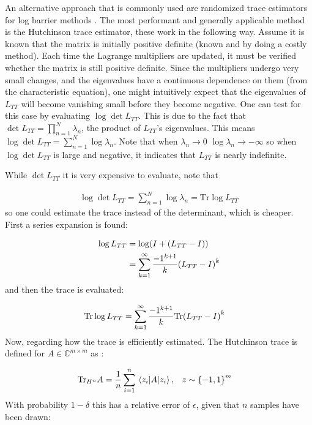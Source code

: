 \documentclass[twocolumn]{revtex4-2}
\begin{document}
An alternative approach that is commonly used are randomized trace estimators for log barrier methods \cite{boyd2004convex}. The most performant and generally applicable method is the Hutchinson trace estimator, these work in the following way. Assume it is known that the matrix is initially positive definite (known and by doing a costly method). Each time the Lagrange multipliers are updated, it must be verified whether the matrix is still positive definite. Since the multipliers undergo very small changes, and the eigenvalues have a continuous dependence on them (from the characteristic equation), one might intuitively expect that the eigenvalues of $L_{TT}$ will become vanishing small before they become negative. One can test for this case by evaluating $\log\det L_{TT}$. This is due to the fact that $\det L_{TT}=\prod_{n=1}^N\lambda_n$, the product of $L_{TT}$’s eigenvalues. This means $\log\det L_{TT}=\sum_{n=1}^N\log\lambda_n$. Note that when $\lambda_n\rightarrow 0$ $\log\lambda_n\rightarrow-\infty$ so when $\log\det L_{TT}$ is large and negative, it indicates that $L_{TT}$ is nearly indefinite.

While $\det L_{TT}$ it is very expensive to evaluate, note that

\begin{align}
\log\det L_{TT}=\sum_{n=1}^N\log\lambda_n = \text{Tr}\log L_{TT}
\end{align}
so one could estimate the trace instead of the determinant, which is cheaper. First a series expansion is found:

\begin{align}
\log L_{TT} &= \log(I + \qty(L_{TT} - I))\\
&=\sum_{k=1}^\infty\frac{-1^{k+1}}{k}\qty(L_{TT} - I)^k
\end{align}
and then the trace is evaluated:


\begin{align}
\text{Tr}\log L_{TT} &= \sum_{k=1}^\infty\frac{-1^{k+1}}{k}\text{Tr}\qty(L_{TT} - I)^k
\end{align}
Now, regarding how the trace is efficiently estimated. The Hutchinson trace is defined for $A\in \mathbb{C}^{m\times m}$ as \cite{skorski2021modern}:

\begin{align}
\text{Tr}_{H^n}A = \frac{1}{n}\sum_{i=1}^n \ev{A}{z_i},\quad &z\sim\qty{-1, 1}^m
\end{align}
With probability $1-\delta$ this has a relative error of $\epsilon$, given that $n$ samples have been drawn:
\end{document}
